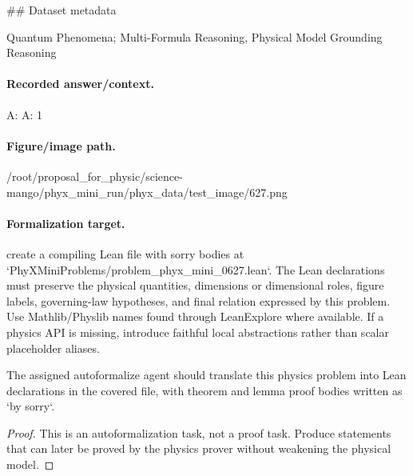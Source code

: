 \#\# Dataset metadata

Quantum Phenomena; Multi-Formula Reasoning, Physical Model Grounding Reasoning

\paragraph{Recorded answer/context.}
A: A: 1

\paragraph{Figure/image path.}
/root/proposal\_for\_physic/science-mango/phyx\_mini\_run/phyx\_data/test\_image/627.png

\paragraph{Formalization target.}
create a compiling Lean file with sorry bodies at `PhyXMiniProblems/problem\_phyx\_mini\_0627.lean`. The Lean declarations must preserve the physical quantities, dimensions or dimensional roles, figure labels, governing-law hypotheses, and final relation expressed by this problem.
Use Mathlib/Physlib names found through LeanExplore where available. If a physics API is missing, introduce faithful local abstractions rather than scalar placeholder aliases.

\begin{theorem}
\label{thm:physics:phyx_mini_0627:target}
The assigned autoformalize agent should translate this physics problem into Lean declarations in the covered file, with theorem and lemma proof bodies written as `by sorry`.
\end{theorem}
\begin{proof}
This is an autoformalization task, not a proof task. Produce statements that can later be proved by the physics prover without weakening the physical model.
\end{proof}

